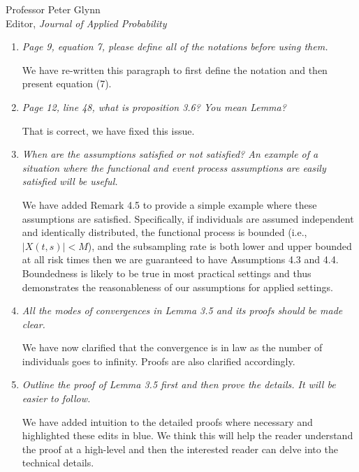 \documentclass[11pt]{letter} %
\begin{document}
\begin{letter}{Professor
	Peter Glynn\\
	Editor, {\em Journal of Applied Probability}}
\begin{enumerate}
\item {\it Page 9, equation 7, please define all of the notations before using them.}

\vspace{5mm}
We have re-written this paragraph to first define the notation and then present equation (7).
\vspace{5mm}

\item {\it Page 12, line 48, what is proposition 3.6? You mean Lemma?}

\vspace{5mm}
That is correct, we have fixed this issue.
\vspace{5mm}

\item {\it When are the assumptions satisfied or not satisfied? An example of a
situation where the functional and event process assumptions are easily satisfied will be useful.}

\vspace{5mm}
We have added Remark 4.5 to provide a simple example where these assumptions are satisfied.  Specifically, if individuals are assumed independent and identically distributed, the functional process is bounded (i.e., $|X(t,s)| < M$), and the subsampling rate is both lower and upper bounded at all risk times then we are guaranteed to have Assumptions 4.3 and 4.4. Boundedness is likely to be true in most practical settings and thus demonstrates the reasonableness of our assumptions for applied settings.
\vspace{5mm}

\item {\it All the modes of convergences in Lemma 3.5 and its proofs should be made clear.}

\vspace{5mm}
We have now clarified that the convergence is in law as the number of individuals goes to infinity.  Proofs are also clarified accordingly.
\vspace{5mm}

\item {\it Outline the proof of Lemma 3.5 first and then prove the details.  It will be easier to follow.}

\vspace{5mm}
We have added intuition to the detailed proofs where necessary and highlighted these edits in blue.  We think this will help the reader understand the proof at a high-level and then the interested reader can delve into the technical details.
\vspace{5mm}


\end{enumerate}
\end{letter}
\end{document}
